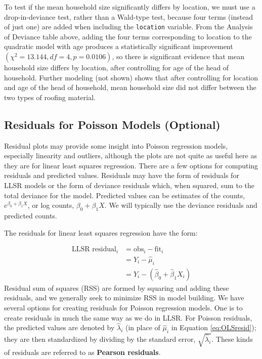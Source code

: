 \documentclass[
]{krantz}
\begin{document}
To test if the mean household size significantly differs by location, we must use a drop-in-deviance test, rather than a Wald-type test, because four terms (instead of just one) are added when including the \texttt{location} variable. From the Analysis of Deviance table above, adding the four terms corresponding to location to the quadratic model with age produces a statistically significant improvement \((\chi^2=13.144, df = 4, p=0.0106)\), so there is significant evidence that mean household size differs by location, after controlling for age of the head of household. Further modeling (not shown) shows that after controlling for location and age of the head of household, mean household size did not differ between the two types of roofing material.

\hypertarget{sec-PoisResid}{%
\subsection{Residuals for Poisson Models (Optional)}\label{sec-PoisResid}}

Residual plots may provide some insight into Poisson regression models, especially linearity and outliers, although the plots are not quite as useful here as they are for linear least squares regression. There are a few options for computing residuals and predicted values. Residuals may have the form of residuals for LLSR models or the form of deviance residuals which, when squared, sum to the total deviance for the model. Predicted values can be estimates of the counts, \(e^{\beta_0+\beta_1X}\), or log counts, \(\beta_0+\beta_1X\). We will typically use the deviance residuals and predicted counts.

The residuals for linear least squares regression have the form:

\begin{align}
 \textrm{LLSR residual}_i  &= \textrm{obs}_i - \textrm{fit}_i \nonumber \\
&={Y_i-\hat{\mu}_i} \nonumber \\
 &= Y_i-(\hat{\beta}_0 +\hat{\beta}_1 X_i)
\label{eq:OLSresid}
 \end{align}
Residual sum of squares (RSS) are formed by squaring and adding these residuals, and we generally seek to minimize RSS in model building. We have several options for creating residuals for Poisson regression models. One is to create residuals in much the same way as we do in LLSR. For Poisson residuals, the predicted values are denoted by \(\hat{\lambda}_i\) (in place of \(\hat{\mu}_i\) in Equation \eqref{eq:OLSresid}); they are then standardized by dividing by the standard error, \(\sqrt{\hat{\lambda}_i}\). These kinds of residuals are referred to as \textbf{Pearson residuals}. 
\end{document}
